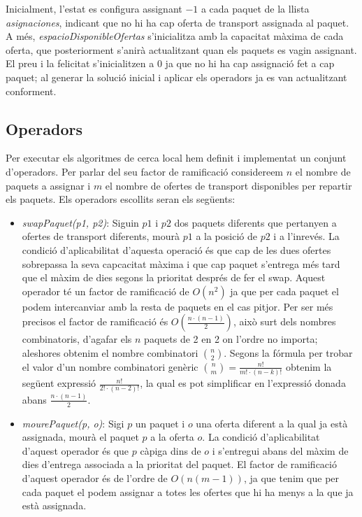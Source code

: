 \documentclass[a4paper]{article}
\begin{document}
	Inicialment, l'estat es configura assignant $-1$ a cada paquet de la llista \emph{asignaciones}, indicant que no hi ha cap oferta de transport assignada al paquet. A més, \emph{espacioDisponibleOfertas} s'inicialitza amb la capacitat màxima de cada oferta, que posteriorment s'anirà actualitzant quan els paquets es vagin assignant. El preu i la felicitat s'inicialitzen a $0$ ja que no hi ha cap assignació fet a cap paquet; al generar la solució inicial i aplicar els operadors ja es van actualitzant conforment.\\
	
	\subsection{Operadors}
	
	Per executar els algoritmes de cerca local hem definit i implementat un conjunt d'operadors. Per parlar del seu factor de ramificació considereem $n$ el nombre de paquets a assignar i $m$ el nombre de ofertes de transport disponibles per repartir els paquets. Els operadors escollits seran els següents:
	
	\begin{itemize}
		\item \emph{swapPaquet(p1, p2)}: Siguin $p1$ i $p2$ dos paquets diferents que pertanyen a ofertes de transport diferents, mourà $p1$ a la posició de $p2$ i a l'inrevés. La condició d'aplicabilitat d'aquesta operació és que cap de les dues ofertes sobrepassa la seva capcacitat màxima i que cap paquet s'entrega més tard que el màxim de dies segons la prioritat després de fer el swap. Aquest operador té un factor de ramificació de $O(n^2)$ ja que per cada paquet el podem intercanviar amb la resta de paquets en el cas pitjor. Per ser més precisos el factor de ramificació és $O(\frac{n·(n-1)}{2})$, això surt dels nombres combinatoris, d'agafar els $n$ paquets de 2 en 2 on l'ordre no importa; aleshores obtenim el nombre combinatori $\binom{n}{2}$. Segons la fórmula per trobar el valor d'un nombre combinatori genèric $\binom{n}{m} = \frac{n!}{m!·(n-k)!}$ obtenim la següent expressió $\frac{n!}{2!·(n-2)!}$, la qual es pot simplificar en l'expressió donada abans $\frac{n·(n-1)}{2}$.


		\item \emph{mourePaquet(p, o)}: Sigi $p$ un paquet i $o$ una oferta diferent a la qual ja està assignada, mourà el paquet $p$ a la oferta $o$. La condició d'aplicabilitat d'aquest operador és que $p$ càpiga dins de $o$ i s'entregui abans del màxim de dies d'entrega associada a la prioritat del paquet. El factor de ramificació d'aquest operador és de l'ordre de $O(n(m-1))$, ja que tenim que per cada paquet el podem assignar a totes les ofertes que hi ha menys a la que ja està assignada.
	\end{itemize}
	
\end{document}
